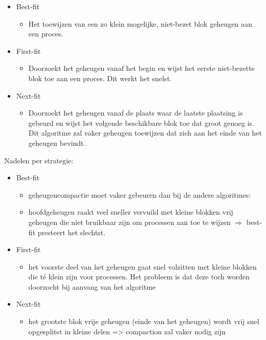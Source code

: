 \begin{itemize}
    \item Best-fit
        \begin{itemize}
        \item Het toewijzen van een zo klein mogelijke, niet-bezet blok geheugen aan een proces.
        \end{itemize}
    \item First-fit
    \begin{itemize}
        \item Doorzoekt het geheugen vanaf het begin en wijst het eerste niet-bezette blok toe aan een proces. Dit werkt het snelst.
        \end{itemize}
    \item Next-fit
    \begin{itemize}
        \item Doorzoekt het geheugen vanaf de plaats waar de laatste plaatsing is gebeurd en wijst het volgende beschikbare blok toe dat groot genoeg is. Dit algoritme zal vaker geheugen toewijzen dat zich aan het einde van het geheugen bevindt.
        \end{itemize}
\end{itemize}

Nadelen per strategie:

\begin{itemize}
    \item Best-fit
        \begin{itemize}
        \item geheugencompactie moet vaker gebeuren dan bij de andere algoritmes:
        \item hoofdgeheugen raakt veel sneller vervuild met kleine blokken vrij geheugen die niet bruikbaar zijn om processen aan toe te wijzen $\Rightarrow$ best-fit presteert het slechtst.
        \end{itemize}
    \item First-fit
    \begin{itemize}
        \item het voorste deel van het geheugen gaat snel volzitten met kleine blokken die té klein zijn voor processen. Het probleem is dat deze toch worden doorzocht bij aanvang van het algoritme
        \end{itemize}
    \item Next-fit
    \begin{itemize}
        \item het grootste blok vrije geheugen (einde van het geheugen) wordt vrij snel opgesplitst in kleine delen => compaction zal vaker nodig zijn
        \end{itemize}
\end{itemize}



